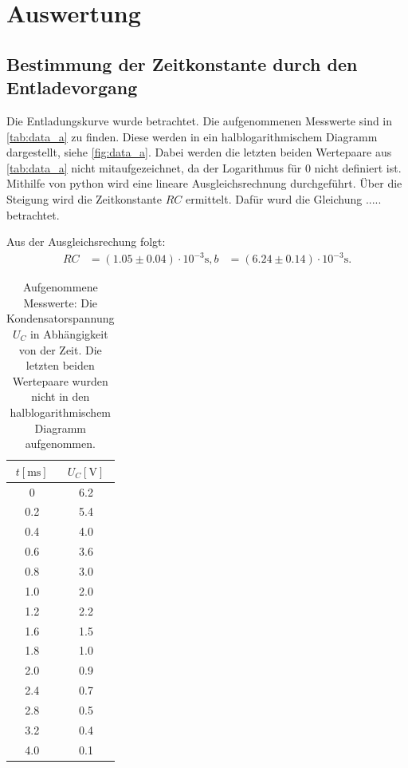 \section{Auswertung}
\label{sec:Auswertung}

\subsection{Bestimmung der Zeitkonstante durch den Entladevorgang}
\label{subsec:Aufgabe_A}
Die Entladungskurve wurde betrachtet.
Die aufgenommenen Messwerte sind in \autoref{tab:data_a} zu finden.
Diese werden in ein halblogarithmischem Diagramm dargestellt, siehe \autoref{fig:data_a}.
Dabei werden die letzten beiden Wertepaare aus \autoref{tab:data_a} nicht mitaufgezeichnet, da der Logarithmus für 0 nicht definiert ist.
Mithilfe von python wird eine lineare Ausgleichsrechnung durchgeführt.
Über die Steigung wird die Zeitkonstante $RC$ ermittelt.
Dafür wurd die Gleichung ..... betrachtet.

\noindent
Aus der Ausgleichsrechung folgt:
\begin{align*}
  RC &= (1.05 \pm 0.04) \cdot 10^{-3} \si{\second},
  b  &= (6.24 \pm 0.14) \cdot 10^{-3} \si{\second}.
\end{align*}

\begin{table}
  \centering
  \caption{Aufgenommene Messwerte: Die Kondensatorspannung $U_C$ in Abhängigkeit von der Zeit.
  Die letzten beiden Wertepaare wurden nicht in den halblogarithmischem Diagramm aufgenommen.}
  \label{tab:data_a}
  \begin{tabular}{c c}
    \toprule
    $t [\si{\milli\second}]$ & $U_C [\si{\volt}]$ \\
    \midrule
      0     &     6.2  \\
      0.2   &     5.4  \\
      0.4   &     4.0  \\
      0.6   &     3.6  \\
      0.8   &     3.0  \\
      1.0   &     2.0  \\
      1.2   &     2.2  \\
      1.6   &     1.5  \\
      1.8   &     1.0  \\
      2.0   &     0.9  \\
      2.4   &     0.7  \\
      2.8   &     0.5  \\
      3.2   &     0.4  \\
      4.0   &     0.1  \\
    \bottomrule
  \end{tabular}
\end{table}

